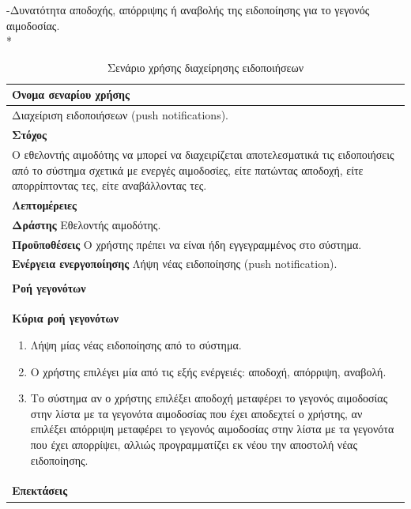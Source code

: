 -Δυνατότητα αποδοχής, απόρριψης ή αναβολής της ειδοποίησης για το γεγονός αιμοδοσίας.
\\*
\begin{table}[H]
	\begin{center}
	    \begin{tabular}{|p{\dimexpr \linewidth-2\tabcolsep}|}
	    \hline
	    \rowcolor{grayy}
	    \textbf{Όνομα σεναρίου χρήσης}
	    \\ \hline    
	     Διαχείριση ειδοποιήσεων (push notifications).
	     \\ \hline
	    \rowcolor{grayy}
	    \textbf{\textbf{Στόχος}}
	    \\ \hline
	 	 Ο εθελοντής αιμοδότης να μπορεί να διαχειρίζεται αποτελεσματικά τις ειδοποιήσεις από το σύστημα σχετικά με ενεργές αιμοδοσίες, είτε πατώντας αποδοχή,  είτε απορρίπτοντας τες, είτε αναβάλλοντας τες.
	    \\ \hline
	    \rowcolor{grayy}
	    \textbf{Λεπτομέρειες}
	    \\ \hline
		\textbf{Δράστης} Εθελοντής αιμοδότης.
		\\*
		\textbf{Προϋποθέσεις} Ο χρήστης πρέπει να είναι ήδη εγγεγραμμένος στο σύστημα.
		\\*
		\textbf{Ενέργεια ενεργοποίησης} Λήψη νέας ειδοποίησης (push notification).
		\\ \hline
	    \\ \hline
		\rowcolor{grayy}    
	    \textbf{Ροή γεγονότων}
	    \\* 
		\textbf{Κύρια ροή γεγονότων}
		\begin{enumerate}
			\item	Λήψη μίας νέας ειδοποίησης από το σύστημα.
			\item  Ο χρήστης επιλέγει μία από τις εξής ενέργειές: αποδοχή, απόρριψη, αναβολή.
			\item Το σύστημα αν ο χρήστης επιλέξει αποδοχή μεταφέρει το γεγονός αιμοδοσίας στην λίστα με τα γεγονότα αιμοδοσίας που έχει αποδεχτεί ο χρήστης, αν επιλέξει απόρριψη μεταφέρει το γεγονός αιμοδοσίας στην λίστα με τα γεγονότα που έχει απορρίψει, αλλιώς προγραμματίζει εκ νέου την αποστολή νέας ειδοποίησης.
		\end{enumerate}
		\\*
		\textbf{Επεκτάσεις}
		   \\ \hline
	    \end{tabular}
	    \caption{Σενάριο χρήσης διαχείρησης ειδοποιήσεων}
	    \label{tab:manage_notifcations} 
	\end{center}		
\end{table}			
			
